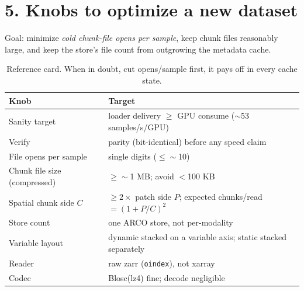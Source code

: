 \documentclass[11pt,a4paper]{article}
\begin{document}
\section*{5. Knobs to optimize a new dataset}

Goal: minimize \emph{cold chunk-file opens per sample}, keep chunk files reasonably large, and keep the
store's file count from outgrowing the metadata cache.

\begin{table}[ht]
\centering\small
\begin{tabular}{@{}p{4.6cm}p{10.6cm}@{}}
\toprule
\textbf{Knob} & \textbf{Target} \\
\midrule
Sanity target           & loader delivery $\ge$ GPU consume ($\sim$53 samples/s/GPU) \\
Verify                  & parity (bit-identical) before any speed claim \\
File opens per sample        & single digits ($\le \sim$10) \\
Chunk file size (compressed) & $\ge \sim$1 MB; avoid $<$100 KB \\
Spatial chunk side $C$  & $\ge 2\times$ patch side $P$; expected chunks/read $=(1+P/C)^2$ \\
Store count             & one ARCO store, not per-modality \\
Variable layout         & dynamic stacked on a variable axis; static stacked separately \\
Reader         & raw zarr (\texttt{oindex}), not xarray \\
Codec                   & Blosc(lz4) fine; decode negligible \\
\bottomrule
\end{tabular}
\caption{Reference card. When in doubt, cut opens/sample first, it pays off in every cache state.}
\end{table}
\end{document}
